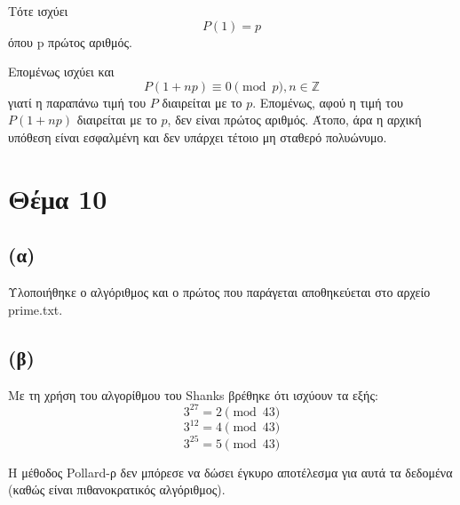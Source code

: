 \documentclass[a4paper, 11pt]{article}
\newcommand{\lt}{\latintext}
\begin{document}
Τότε ισχύει
\[P(1) = p\]
όπου p πρώτος αριθμός.

Επομένως ισχύει και
\[P(1 + np) \equiv 0 \pmod{p}, n \in \mathbb{Z} \]
γιατί η παραπάνω τιμή του $P$ διαιρείται με το $p$. Επομένως, αφού η τιμή του $P(1+np)$ διαιρείται με το $p$, δεν είναι πρώτος αριθμός. Άτοπο, άρα η αρχική υπόθεση είναι εσφαλμένη και δεν υπάρχει τέτοιο μη σταθερό πολυώνυμο.

\section*{Θέμα 10}
\subsection*{(α)} Υλοποιήθηκε ο αλγόριθμος και ο πρώτος που παράγεται αποθηκεύεται στο αρχείο {\lt prime.txt}.
\subsection*{(β)} Με τη χρήση του αλγορίθμου του {\lt Shanks} βρέθηκε ότι ισχύουν τα εξής:
\[3^{27} = 2 \pmod{43}\]
\[3^{12} = 4 \pmod{43}\]
\[3^{25} = 5 \pmod{43}\]

Η μέθοδος {\lt Pollard-}ρ δεν μπόρεσε να δώσει έγκυρο αποτέλεσμα για αυτά τα δεδομένα (καθώς είναι πιθανοκρατικός αλγόριθμος).
\end{document}
